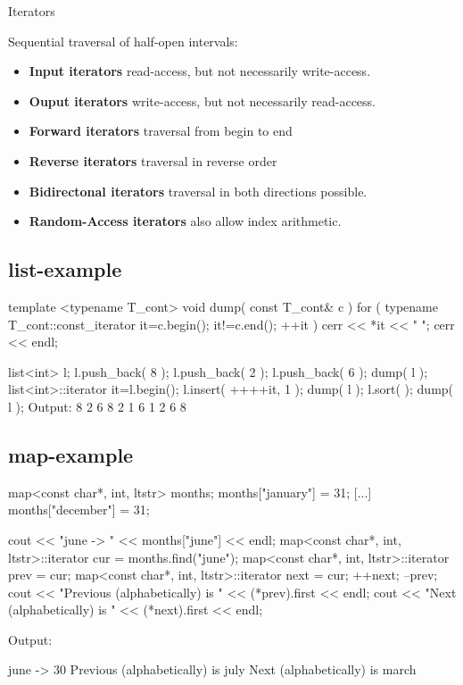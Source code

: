 \centerline{\large Iterators}

Sequential traversal of half-open intervals: \id{[begin,.........,end)}
\begin{itemize}
\item {\bf Input iterators} read-access, but not necessarily write-access.
\item {\bf Ouput iterators} write-access, but not necessarily read-access.
\item {\bf Forward iterators} traversal from begin to end
\item {\bf Reverse iterators} traversal in reverse order
\item {\bf Bidirectonal iterators} traversal in both directions possible.
\item {\bf Random-Access iterators} also allow index arithmetic.

\end{itemize}


\subsection{list-example}

\begin{myverbatim}
template <typename T_cont>
void dump( const T_cont& c ) {
  for ( typename T_cont::const_iterator it=c.begin();
    it!=c.end(); ++it ) { cerr << *it << " "; }
  cerr << endl;
}

list<int> l;
l.push_back( 8 ); l.push_back( 2 ); l.push_back( 6 );
dump( l );
list<int>::iterator it=l.begin();
l.insert( ++++it, 1 ); dump( l );
l.sort( );             dump( l );
Output:
8 2 6
8 2 1 6
1 2 6 8
\end{myverbatim}

\subsection{map-example}
{\small
\begin{myverbatim}
map<const char*, int, ltstr> months;
months["january"] = 31;
[...]
months["december"] = 31;

cout << "june -> " << months["june"] << endl;
map<const char*, int, ltstr>::iterator cur  = months.find("june");
map<const char*, int, ltstr>::iterator prev = cur;
map<const char*, int, ltstr>::iterator next = cur;
++next;
--prev;
cout << "Previous (alphabetically) is " << (*prev).first << endl;
cout << "Next (alphabetically) is " << (*next).first << endl;
\end{myverbatim}
Output:
\begin{myverbatim}
june -> 30
Previous (alphabetically) is july
Next (alphabetically) is march
\end{myverbatim}
}


